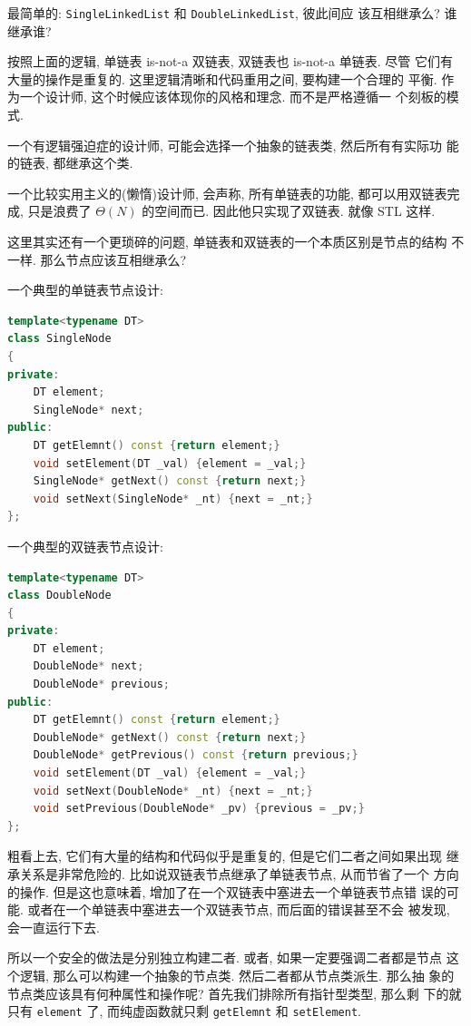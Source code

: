 \documentclass[a4paper]{ctexart}
\theoremstyle{definition}
\theoremstyle{definition}
\begin{document}
最简单的: \verb|SingleLinkedList| 和 \verb|DoubleLinkedList|, 彼此间应
该互相继承么? 谁继承谁?

按照上面的逻辑, 单链表 is-not-a 双链表, 双链表也 is-not-a 单链表. 尽管
它们有大量的操作是重复的. 这里逻辑清晰和代码重用之间, 要构建一个合理的
平衡. 作为一个设计师, 这个时候应该体现你的风格和理念. 而不是严格遵循一
个刻板的模式. 

一个有逻辑强迫症的设计师, 可能会选择一个抽象的链表类, 然后所有有实际功
能的链表, 都继承这个类.

一个比较实用主义的(懒惰)设计师, 会声称, 所有单链表的功能, 都可以用双链表完成,
只是浪费了 $\Theta(N)$ 的空间而已. 因此他只实现了双链表. 就像 STL 这样.

这里其实还有一个更琐碎的问题, 单链表和双链表的一个本质区别是节点的结构
不一样. 那么节点应该互相继承么?

一个典型的单链表节点设计:

\begin{lstlisting}[language=C++]
template<typename DT>
class SingleNode
{
private:
    DT element;
    SingleNode* next;
public:
    DT getElemnt() const {return element;}
    void setElement(DT _val) {element = _val;}
    SingleNode* getNext() const {return next;}
    void setNext(SingleNode* _nt) {next = _nt;} 
};
\end{lstlisting}

一个典型的双链表节点设计:

\begin{lstlisting}[language=C++]
template<typename DT>
class DoubleNode
{
private:
    DT element;
    DoubleNode* next;
    DoubleNode* previous;
public:
    DT getElemnt() const {return element;}
    DoubleNode* getNext() const {return next;}
    DoubleNode* getPrevious() const {return previous;}
    void setElement(DT _val) {element = _val;}
    void setNext(DoubleNode* _nt) {next = _nt;}
    void setPrevious(DoubleNode* _pv) {previous = _pv;}
};
\end{lstlisting}

粗看上去, 它们有大量的结构和代码似乎是重复的, 但是它们二者之间如果出现
继承关系是非常危险的. 比如说双链表节点继承了单链表节点, 从而节省了一个
方向的操作. 但是这也意味着, 增加了在一个双链表中塞进去一个单链表节点错
误的可能. 或者在一个单链表中塞进去一个双链表节点, 而后面的错误甚至不会
被发现, 会一直运行下去. 

所以一个安全的做法是分别独立构建二者. 或者, 如果一定要强调二者都是节点
这个逻辑, 那么可以构建一个抽象的节点类. 然后二者都从节点类派生. 那么抽
象的节点类应该具有何种属性和操作呢? 首先我们排除所有指针型类型, 那么剩
下的就只有 \verb|element| 了, 而纯虚函数就只剩 \verb|getElemnt| 和
\verb|setElement|.
\end{document}
